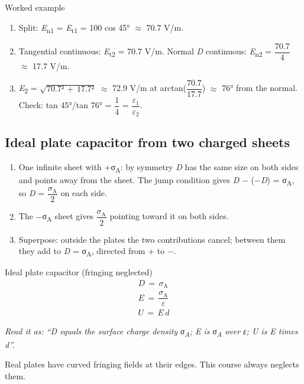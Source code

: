 \documentclass[11pt]{article}
\begin{document}
\begin{keepsection}
\begin{workedbox}{Worked example}
\begin{enumerate}
\item Split: \textit{E}\textsubscript{n1} = \textit{E}\textsubscript{t1} = 100 cos 45° \ensuremath{\approx} 70.7 V/m.
\item Tangential continuous: \textit{E}\textsubscript{t2} = 70.7 V/m. Normal \textit{D} continuous: \textit{E}\textsubscript{n2} = {\small\ensuremath{\dfrac{70.7}{4}}} \ensuremath{\approx} 17.7 V/m.
\item \textit{E}\textsubscript{2} = \ensuremath{\sqrt{70.7²\, +\, 17.7²}} \ensuremath{\approx} 72.9 V/m at arctan({\small\ensuremath{\dfrac{70.7}{17.7}}}) \ensuremath{\approx} 76° from the normal. Check: tan 45°/tan 76° = {\small\ensuremath{\dfrac{1}{4}}} = {\small\ensuremath{\dfrac{ε_{1}}{ε_{2}}}}.
\end{enumerate}
\end{workedbox}

\begin{keepsection}
\subsection{Ideal plate capacitor from two charged sheets}

\begin{enumerate}
\item One infinite sheet with +σ\textsubscript{A}: by symmetry \textit{D} has the same size on both sides and points away from the sheet. The jump condition gives \textit{D} \ensuremath{-} (\ensuremath{-}\textit{D}) = σ\textsubscript{A}, so \textit{D} = {\small\ensuremath{\dfrac{σ_{\mathrm{A}}}{2}}} on each side.
\item The \ensuremath{-}σ\textsubscript{A} sheet gives {\small\ensuremath{\dfrac{σ_{\mathrm{A}}}{2}}} pointing toward it on both sides.
\item Superpose: outside the plates the two contributions cancel; between them they add to \textit{D} = σ\textsubscript{A}, directed from + to \ensuremath{-}.
\end{enumerate}

\begin{equationcard}{Ideal plate capacitor (fringing neglected)}
\[ \begin{gathered} {D}\, =\, σ_{\mathrm{A}} \\ {E}\, =\, \dfrac{σ_{\mathrm{A}}}{ε} \\ {U}\, =\, {E\,d} \end{gathered} \]
{\small \emph{Read it as: “D equals the surface charge density σ\textsubscript{A}; E is σ\textsubscript{A} over ε; U is E times d”.}\par Real plates have curved fringing fields at their edges. This course always neglects them.}
\end{equationcard}


\end{keepsection}
\end{keepsection}
\end{document}
